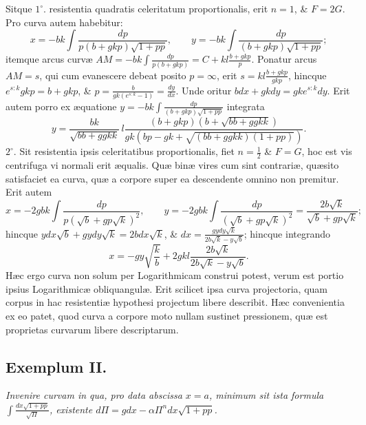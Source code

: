 Sitque $1^\circ$. resistentia quadratis celeritatum proportionalis, erit $n=1$, \& $F=2G$. Pro curva autem habebitur:
\[
x=-bk\int\frac{dp}{p(b+gkp)\sqrt{1+pp}},\qquad
y=-bk\int\frac{dp}{(b+gkp)\sqrt{1+pp}};
\]
itemque arcus curvæ $AM=-bk\int\frac{dp}{p(b+gkp)}=C+kl\frac{b+gkp}{p}$. Ponatur arcus $AM=s$, qui cum evanescere debeat posito $p=\infty$, erit $s=kl\frac{b+gkp}{gkp}$, hincque $e^{s:k}gkp=b+gkp$, \& $p=\frac{b}{gk(e^{s:k}-1)}=\frac{dy}{dx}$. Unde oritur $bdx+gkdy=gke^{s:k}dy$. Erit autem porro ex æquatione $y=-bk\int\frac{dp}{(b+gkp)\sqrt{1+pp}}$ integrata
\[
y=\frac{bk}{\sqrt{bb+ggkk}}\,l\frac{(b+gkp)(b+\sqrt{bb+ggkk})}{gk(bp-gk+\sqrt{(bb+ggkk)(1+pp)})}.
\]
$2^\circ$. Sit resistentia ipsis celeritatibus proportionalis, fiet $n=\frac12$ \& $F=G$, hoc est vis centrifuga vi normali erit æqualis. Quæ binæ vires cum sint contrariæ, quæsito satisfaciet ea curva, quæ a corpore super ea descendente omnino non premitur. Erit autem
\[
x=-2gbk\int\frac{dp}{p(\sqrt b+gp\sqrt k)^2},\qquad
y=-2gbk\int\frac{dp}{(\sqrt b+gp\sqrt k)^2}=\frac{2b\sqrt k}{\sqrt b+gp\sqrt k};
\]
hincque $ydx\sqrt b+gydy\sqrt k=2bdx\sqrt k$, \& $dx=\frac{gydy\sqrt k}{2b\sqrt k-y\sqrt b}$; hincque integrando
\[
x=-gy\sqrt{\frac{k}{b}}+2gkl\frac{2b\sqrt k}{2b\sqrt k-y\sqrt b}.
\]
Hæc ergo
curva non solum per Logarithmicam construi potest, verum est portio ipsius Logarithmicæ obliquangulæ. Erit scilicet ipsa curva projectoria, quam corpus in hac resistentiæ hypothesi projectum libere describit. Hæc convenientia ex eo patet, quod curva a corpore moto nullam sustinet pressionem, quæ est proprietas curvarum libere descriptarum.
\subsection*{Exemplum II.}
 \textit{Invenire curvam in qua, pro data abscissa $x=a$, minimum sit ista formula $\int\frac{dx\sqrt{1+pp}}{\sqrt\Pi}$, existente $d\Pi=gdx-\alpha\Pi^n dx\sqrt{1+pp}$.}

